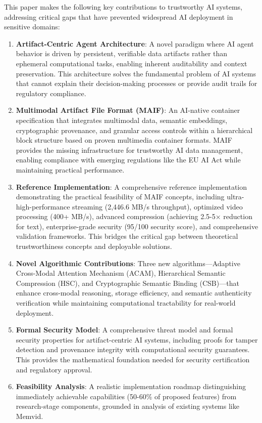 \documentclass[conference]{IEEEtran}
\begin{document}
This paper makes the following key contributions to trustworthy AI systems, addressing critical gaps that have prevented widespread AI deployment in sensitive domains:

\begin{enumerate}[leftmargin=*]
\item \textbf{Artifact-Centric Agent Architecture}: A novel paradigm where AI agent behavior is driven by persistent, verifiable data artifacts rather than ephemeral computational tasks, enabling inherent auditability and context preservation. This architecture solves the fundamental problem of AI systems that cannot explain their decision-making processes or provide audit trails for regulatory compliance.

\item \textbf{Multimodal Artifact File Format (MAIF)}: An AI-native container specification that integrates multimodal data, semantic embeddings, cryptographic provenance, and granular access controls within a hierarchical block structure based on proven multimedia container formats. MAIF provides the missing infrastructure for trustworthy AI data management, enabling compliance with emerging regulations like the EU AI Act while maintaining practical performance.

\item \textbf{Reference Implementation}: A comprehensive reference implementation demonstrating the practical feasibility of MAIF concepts, including ultra-high-performance streaming (2,446.6 MB/s throughput), optimized video processing (400+ MB/s), advanced compression (achieving 2.5-5× reduction for text), enterprise-grade security (95/100 security score), and comprehensive validation frameworks. This bridges the critical gap between theoretical trustworthiness concepts and deployable solutions.

\item \textbf{Novel Algorithmic Contributions}: Three new algorithms—Adaptive Cross-Modal Attention Mechanism (ACAM), Hierarchical Semantic Compression (HSC), and Cryptographic Semantic Binding (CSB)—that enhance cross-modal reasoning, storage efficiency, and semantic authenticity verification while maintaining computational tractability for real-world deployment.

\item \textbf{Formal Security Model}: A comprehensive threat model and formal security properties for artifact-centric AI systems, including proofs for tamper detection and provenance integrity with computational security guarantees. This provides the mathematical foundation needed for security certification and regulatory approval.

\item \textbf{Feasibility Analysis}: A realistic implementation roadmap distinguishing immediately achievable capabilities (50-60\% of proposed features) from research-stage components, grounded in analysis of existing systems like Memvid.
\end{enumerate}
\end{document}
